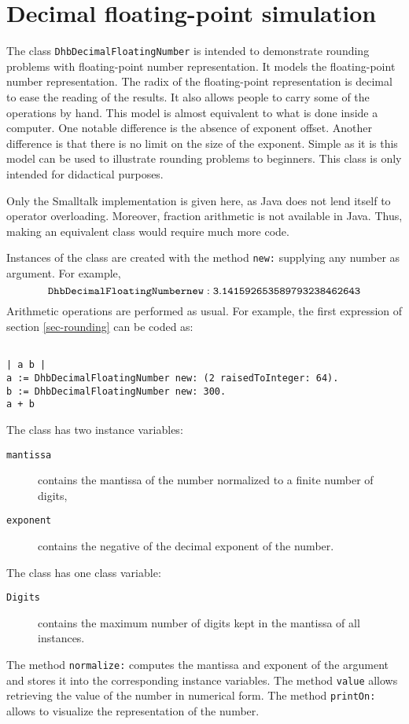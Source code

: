 \documentclass[twoside]{book}
\begin{document}
\fi



\chapter{Decimal floating-point simulation}
\label{ch-fpSimul} The class {\tt DhbDecimalFloatingNumber} is
intended to demonstrate rounding problems with floating-point
number representation. It models the floating-point number
representation. The radix of the floating-point representation is
decimal to ease the reading of the results. It also allows people
to carry some of the operations by hand. This model is almost
equivalent to what is done inside a computer. One notable
difference is the absence of exponent offset. Another difference
is that there is no limit on the size of the exponent. Simple as
it is this model can be used to illustrate rounding problems to
beginners. This class is only intended for didactical purposes.

Only the Smalltalk implementation is given here, as Java does not
lend itself to operator overloading. Moreover, fraction arithmetic
is not available in Java. Thus, making an equivalent class would
require much more code.

Instances of the class are created with the method {\tt new:}
supplying any number as argument. For example, $${\tt
DhbDecimalFloatingNumber new: 3.141592653589793238462643}$$
Arithmetic operations are performed as usual. For example, the
first expression of section \ref{sec-rounding} can be coded as:

\begin{codeExample}
\begin{verbatim}

| a b |
a := DhbDecimalFloatingNumber new: (2 raisedToInteger: 64).
b := DhbDecimalFloatingNumber new: 300.
a + b
\end{verbatim}
\end{codeExample}
The class has two instance variables:
\begin{description}
\item[{\tt mantissa}] contains the mantissa of the number normalized to a finite number of
digits,
\item[{\tt exponent}] contains the negative of the decimal exponent of the number.
\end{description}
The class has one class variable:
\begin{description}
\item[{\tt Digits}] contains the maximum number of digits kept in the mantissa of all instances.
\end{description}
The method {\tt normalize:} computes the mantissa and exponent of
the argument and stores it into the corresponding instance
variables. The method {\tt value} allows retrieving the value of
the number in numerical form. The method {\tt printOn:} allows to
visualize the representation of the number.
\end{document}
